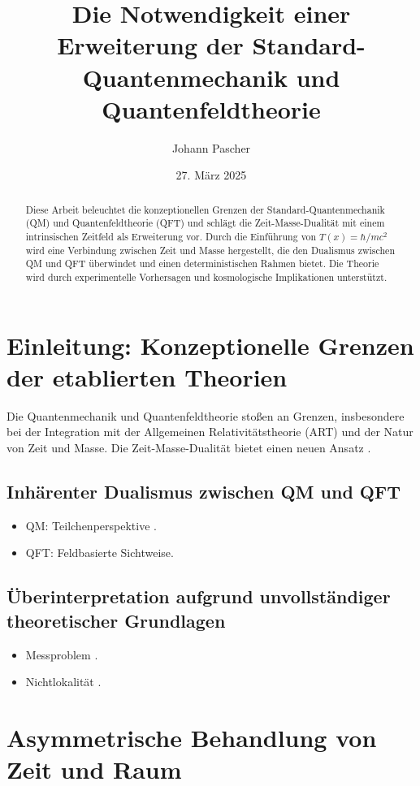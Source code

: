 \documentclass[12pt,a4paper]{article}
\title{Die Notwendigkeit einer Erweiterung der Standard-Quantenmechanik und Quantenfeldtheorie}
\author{Johann Pascher}
\date{27. März 2025}
\newcommand{\Tfield}{T(x)}
\begin{document}
	
	\maketitle
	
	\begin{abstract}
		Diese Arbeit beleuchtet die konzeptionellen Grenzen der Standard-Quantenmechanik (QM) und Quantenfeldtheorie (QFT) und schlägt die Zeit-Masse-Dualität mit einem intrinsischen Zeitfeld als Erweiterung vor. Durch die Einführung von \(\Tfield = \hbar/mc^2\) wird eine Verbindung zwischen Zeit und Masse hergestellt, die den Dualismus zwischen QM und QFT überwindet und einen deterministischen Rahmen bietet. Die Theorie wird durch experimentelle Vorhersagen und kosmologische Implikationen unterstützt.
	\end{abstract}
	
	\tableofcontents
	\newpage
	
	\section{Einleitung: Konzeptionelle Grenzen der etablierten Theorien}
	Die Quantenmechanik und Quantenfeldtheorie stoßen an Grenzen, insbesondere bei der Integration mit der Allgemeinen Relativitätstheorie (ART) und der Natur von Zeit und Masse. Die Zeit-Masse-Dualität bietet einen neuen Ansatz \cite{pascher_wesentl_2025}.
	
	\subsection{Inhärenter Dualismus zwischen QM und QFT}
	\begin{itemize}
		\item QM: Teilchenperspektive \cite{schrodinger}.
		\item QFT: Feldbasierte Sichtweise.
	\end{itemize}
	
	\subsection{Überinterpretation aufgrund unvollständiger theoretischer Grundlagen}
	\begin{itemize}
		\item Messproblem \cite{einstein2}.
		\item Nichtlokalität \cite{bell}.
	\end{itemize}
	
	\section{Asymmetrische Behandlung von Zeit und Raum}
\end{document}
